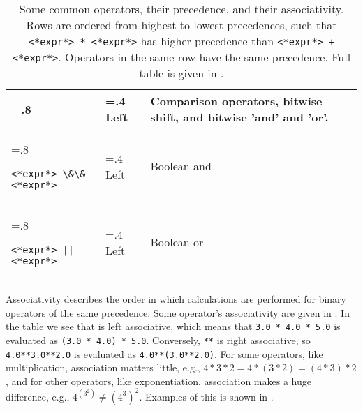 \begin{table}
\begin{tabularx}{\linewidth}{|>{\hsize=.8\hsize\raggedright\arraybackslash}X|>{\hsize=.4\hsize}X|>{\hsize=1.8\hsize}X|}
             & Left & Comparison operators, bitwise shift, and bitwise 'and' and 'or'.\\
    \hline
    \mbox{\lstinline[language=syntax]|<*expr*> \&\& <*expr*>|\hspace*{7mm}} & Left & Boolean and\\
    \hline
    \mbox{\lstinline[language=syntax]+<*expr*> || <*expr*>+\hspace*{7mm}} & Left & Boolean or\\
    \hline
  \end{tabularx}
  \caption{Some common operators, their precedence, and their associativity. Rows are ordered from highest to lowest precedences, such that \lstinline|<*expr*> * <*expr*>| has higher precedence than \lstinline|<*expr*> + <*expr*>|. Operators in the same row have the same precedence. Full table is given in .}
  \label{tab:someOperatorPrecedences}
\end{table}

Associativity describes the order in which calculations are performed for binary operators of the same precedence. Some operator's associativity are given in . In the table we see that \lexeme{*} is left associative, which means that \lstinline{3.0 * 4.0 * 5.0} is evaluated as \lstinline{(3.0 * 4.0) * 5.0}. Conversely, \lstinline{**} is right associative, so \lstinline{4.0**3.0**2.0} is evaluated as \lstinline{4.0**(3.0**2.0)}. For some operators, like multiplication, association matters little, e.g., $4*3*2=4*(3*2)=(4*3)*2$, and for other operators, like exponentiation, association makes a huge difference, e.g., $4^{(3^2)}\neq (4^3)^2$. Examples of this is shown in .
%
%

